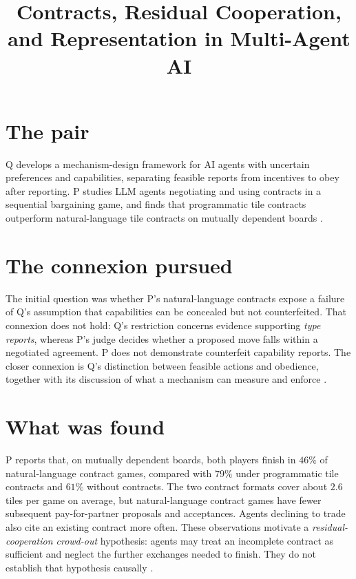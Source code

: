 \documentclass{article}
\title{Contracts, Residual Cooperation, and Representation in Multi-Agent AI}
\begin{document}
\maketitle

\section*{The pair}

Q develops a mechanism-design framework for AI agents with uncertain preferences and capabilities, separating feasible reports from incentives to obey after reporting. P studies LLM agents negotiating and using contracts in a sequential bargaining game, and finds that programmatic tile contracts outperform natural-language tile contracts on mutually dependent boards .

\section*{The connexion pursued}

The initial question was whether P's natural-language contracts expose a failure of Q's assumption that capabilities can be concealed but not counterfeited. That connexion does not hold: Q's restriction concerns evidence supporting \emph{type reports}, whereas P's judge decides whether a proposed move falls within a negotiated agreement. P does not demonstrate counterfeit capability reports. The closer connexion is Q's distinction between feasible actions and obedience, together with its discussion of what a mechanism can measure and enforce .

\section*{What was found}

P reports that, on mutually dependent boards, both players finish in \(46\%\) of natural-language contract games, compared with \(79\%\) under programmatic tile contracts and \(61\%\) without contracts. The two contract formats cover about \(2.6\) tiles per game on average, but natural-language contract games have fewer subsequent pay-for-partner proposals and acceptances. Agents declining to trade also cite an existing contract more often. These observations motivate a \emph{residual-cooperation crowd-out} hypothesis: agents may treat an incomplete contract as sufficient and neglect the further exchanges needed to finish. They do not establish that hypothesis causally .
\end{document}
